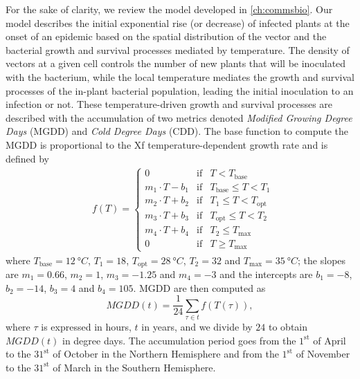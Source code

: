 For the sake of clarity, we review the model developed in \cref{ch:commsbio}.
Our model describes the initial exponential rise (or decrease) of infected
plants at the onset of an epidemic based on the spatial distribution of the
vector and the bacterial growth and survival processes mediated by temperature.
The density of vectors at a given cell controls the number of new plants that
will be inoculated with the bacterium, while the local temperature mediates the
growth and survival processes of the in-plant bacterial population, leading the
initial inoculation to an infection or not. These temperature-driven growth and
survival processes are described with the accumulation of two metrics denoted
\textit{Modified Growing Degree Days} (MGDD) and \textit{Cold Degree Days}
(CDD). The base function to compute the MGDD is proportional to the Xf
temperature-dependent growth rate and is defined by
\begin{align*}
     & f(T)=\left\{\begin{array}{lll}
                       0                & \textrm{if} & T<T_{\textrm{base}}
                       \\
                       m_1\cdot T-b_1   & \textrm{if} & T_{\textrm{base}} \leq
                       T < T_1
                       \\
                       m_2\cdot T + b_2 & \textrm{if} & T_{1} \leq T <
                       T_{\textrm{opt}}
                       \\
                       m_3\cdot T + b_3 & \textrm{if} & T_{\textrm{opt}}
                       \leq T
                       < T_2
                       \\
                       m_4\cdot T + b_4 & \textrm{if} & T_2 \leq
                       T_{\textrm{max}}
                       \\
                       0                & \textrm{if} & T\geq T_{\textrm{max}}
                   \end{array}\right. \,
\end{align*}
where $T_{\textrm{base}}=\SI{12}{\degree C}$, $T_1=18$,
$T_{\textrm{opt}}=\SI{28}{\degree C}$,	$T_2=32$ and
$T_{\textrm{max}}=\SI{35}{\degree C}$; the slopes are $m_1= 0.66$, $m_2=1$,
$m_3=-1.25$ and $m_4=-3$ and the intercepts are $b_1=-8$, $b_2=-14$, $b_3=4$
and $b_4=105$. MGDD are then computed as
\begin{equation*}
    MGDD(t) = \frac{1}{24}\sum_{\tau \in t} f(T(\tau)),
\end{equation*}
where $\tau$ is expressed in hours, $t$ in years, and we divide by $24$ to
obtain $MGDD(t)$ in degree days. The accumulation period goes from the
$1^{\mathrm{st}}$ of April to the $31^{\mathrm{st}}$ of October in the Northern
Hemisphere and from the $1^{\mathrm{st}}$ of November to the $31^{\mathrm{st}}$
of March in the Southern Hemisphere.

